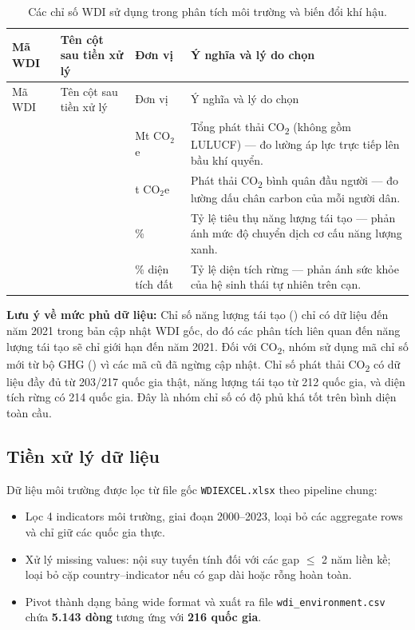 \begin{longtable}{L{3.8cm}L{3.5cm}L{1.3cm}L{5cm}}
\caption{Các chỉ số WDI sử dụng trong phân tích môi trường và biến đổi khí hậu.}
\label{tab:environment-indicators}\\
\toprule
Mã WDI & Tên cột sau tiền xử lý & Đơn vị & Ý nghĩa và lý do chọn \\
\midrule
\endfirsthead
\toprule
Mã WDI & Tên cột sau tiền xử lý & Đơn vị & Ý nghĩa và lý do chọn \\
\midrule
\endhead
{} &  & Mt CO$_2$e & Tổng phát thải CO\textsubscript{2} (không gồm LULUCF) --- đo lường áp lực trực tiếp lên bầu khí quyển. \\
 &  & t CO$_2$e & Phát thải CO\textsubscript{2} bình quân đầu người --- đo lường dấu chân carbon của mỗi người dân. \\
 &  & \% & Tỷ lệ tiêu thụ năng lượng tái tạo --- phản ánh mức độ chuyển dịch cơ cấu năng lượng xanh. \\
 &  & \% diện tích đất & Tỷ lệ diện tích rừng --- phản ánh sức khỏe của hệ sinh thái tự nhiên trên cạn. \\
\bottomrule
\end{longtable}

\textbf{Lưu ý về mức phủ dữ liệu:} Chỉ số năng lượng tái tạo () chỉ có dữ liệu đến năm 2021 trong bản cập nhật WDI gốc, do đó các phân tích liên quan đến năng lượng tái tạo sẽ chỉ giới hạn đến năm 2021. Đối với CO\textsubscript{2}, nhóm sử dụng mã chỉ số mới từ bộ GHG () vì các mã cũ đã ngừng cập nhật. Chỉ số phát thải CO\textsubscript{2} có dữ liệu đầy đủ từ 203/217 quốc gia thật, năng lượng tái tạo từ 212 quốc gia, và diện tích rừng có 214 quốc gia. Đây là nhóm chỉ số có độ phủ khá tốt trên bình diện toàn cầu.

\subsection{Tiền xử lý dữ liệu}

Dữ liệu môi trường được lọc từ file gốc \texttt{WDIEXCEL.xlsx} theo pipeline chung:
\begin{itemize}
    \item Lọc 4 indicators môi trường, giai đoạn 2000--2023, loại bỏ các aggregate rows và chỉ giữ các quốc gia thực.
    \item Xử lý missing values: nội suy tuyến tính đối với các gap $\leq$ 2 năm liền kề; loại bỏ cặp country--indicator nếu có gap dài hoặc rỗng hoàn toàn.
    \item Pivot thành dạng bảng wide format và xuất ra file \texttt{wdi\_environment.csv} chứa \textbf{5.143 dòng} tương ứng với \textbf{216 quốc gia}.
\end{itemize}

